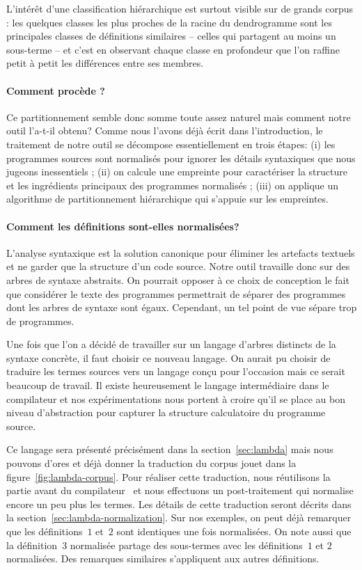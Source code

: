L'intérêt d'une classification hiérarchique est surtout visible sur de
grands corpus : les quelques classes les plus proches de la racine du
dendrogramme sont les principales classes de définitions similaires
-- celles qui partagent au moins un sous-terme -- et c'est
en observant chaque classe en profondeur que l'on raffine petit à
petit les différences entre ses membres.

\paragraph{Comment procède {\Asak}?}
Ce partitionnement semble donc somme toute assez naturel mais comment
notre outil l'a-t-il obtenu? Comme nous l'avons déjà écrit dans
l'introduction, le traitement de notre outil se décompose
essentiellement en trois étapes: (i) les programmes sources sont
normalisés pour ignorer les détails syntaxiques que nous jugeons
inessentiels ; (ii) on calcule une empreinte pour caractériser la
structure et les ingrédients principaux des programmes normalisés ;
(iii) on applique un algorithme de partitionnement hiérarchique qui
s'appuie sur les empreintes.

\paragraph{Comment les définitions sont-elles normalisées?}
L'analyse syntaxique est la solution canonique pour éliminer les
artefacts textuels et ne garder que la structure d'un code source.
Notre outil travaille donc sur des arbres de syntaxe abstraits.  On
pourrait opposer à ce choix de conception le fait que considérer le
texte des programmes permettrait de séparer des programmes dont les
arbres de syntaxe sont égaux. Cependant, un tel point de vue sépare
trop de programmes.

Une fois que l'on a décidé de travailler sur un langage d'arbres
distincts de la syntaxe concrète, il faut choisir ce nouveau langage.
On aurait pu choisir de traduire les termes sources vers un langage
conçu pour l'occasion mais ce serait beaucoup de travail. Il existe
heureusement le langage intermédiaire {\LambdaCode} dans le
compilateur et nos expérimentations nous portent à croire qu'il se
place au bon niveau d'abstraction pour capturer la structure
calculatoire du programme source.

Ce langage sera présenté précisément dans la section~\ref{sec:lambda}
mais nous pouvons d'ores et déjà donner la traduction du corpus jouet
dans la figure~\ref{fig:lambda-corpus}. Pour réaliser cette
traduction, nous réutilisons la partie avant du compilateur~{\OCaml}
et nous effectuons un post-traitement qui normalise encore un peu plus
les termes. Les détails de cette traduction seront décrits dans la
section~\ref{sec:lambda-normalization}. Sur nos exemples, on peut déjà
remarquer que les définitions~$1$ et~$2$ sont identiques une fois
normalisées. On note aussi que la définition~$3$ normalisée partage
des sous-termes avec les définitions~$1$ et $2$ normalisées. Des
remarques similaires s'appliquent aux autres définitions.

